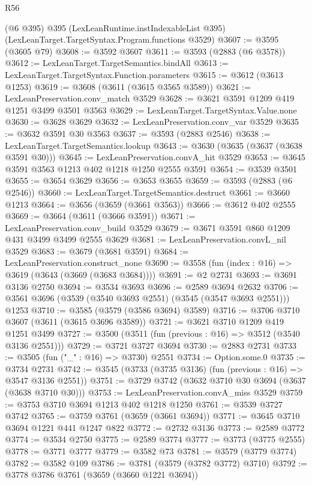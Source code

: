 \begin{lexlean}{R56}
\begin{coremodule}
    (@6 @395)
    @395
    (LexLeanRuntime.instIndexableList @395)
    (LexLeanTarget.TargetSyntax.Program.functions @3529)
@3607 := @3595 (@3605 @79)
@3608 := @3592 @3607
@3611 := @3593 (@2883 (@6 @3578))
@3612 := LexLeanTarget.TargetSemantics.bindAll
@3613 := LexLeanTarget.TargetSyntax.Function.parameters
@3615 := @3612 (@3613 @1253)
@3619 := @3608 (@3611 (@3615 @3565 @3589))
@3621 := LexLeanPreservation.conv_match @3529
@3628 := @3621 @3591 @1209 @419 @1251 @3499 @3501 @3563
@3629 := LexLeanTarget.TargetSyntax.Value.none
@3630 := @3628 @3629
@3632 := LexLeanPreservation.conv_var @3529
@3635 := @3632 @3591 @30 @3563
@3637 := @3593 (@2883 @2546)
@3638 := LexLeanTarget.TargetSemantics.lookup
@3643 := @3630 (@3635 (@3637 (@3638 @3591 @30)))
@3645 := LexLeanPreservation.convA_hit @3529
@3653 := @3645 @3591 @3563 @1213 @402 @1218 @1250 @2555 @3591
@3654 := @3539 @3501
@3655 := @3654 @3629
@3656 := @3653 @3655
@3659 := @3593 (@2883 (@6 @2546))
@3660 := LexLeanTarget.TargetSemantics.destruct
@3661 := @3660 @1213
@3664 := @3656 (@3659 (@3661 @3563))
@3666 := @3612 @402 @2555
@3669 := @3664 (@3611 (@3666 @3591))
@3671 := LexLeanPreservation.conv_build @3529
@3679 := @3671 @3591 @860 @1209 @431 @3499 @3499 @2555 @3629
@3681 := LexLeanPreservation.convL_nil @3529
@3683 := @3679 (@3681 @3591)
@3684 := LexLeanPreservation.construct_none
@3690 := @3558 (fun (index : @16) => @3619 (@3643 (@3669 (@3683 @3684))))
@3691 := @2 @2731
@3693 := @3691 @3136 @2750
@3694 := @3534 @3693
@3696 := @2589 @3694 @2632
@3706 := @3561 @3696 (@3539 (@3540 @3693 @2551) (@3545 (@3547 @3693 @2551))) @1253
@3710 := @3585 (@3579 (@3586 @3694) @3589)
@3716 := @3706 @3710 @3607 (@3611 (@3615 @3696 @3589))
@3721 := @3621 @3710 @1209 @419 @1251 @3499
@3727 := @3500 (@3511 (fun (previous : @16) => @3512 (@3540 @3136 @2551)))
@3729 := @3721 @3727 @3694
@3730 := @2883 @2731
@3733 := @3505 (fun ("_" : @16) => @3730) @2551
@3734 := Option.some.{0}
@3735 := @3734 @2731
@3742 := @3545 (@3733 (@3735 @3136) (fun (previous : @16) => @3547 @3136 @2551))
@3751 := @3729 @3742 (@3632 @3710 @30 @3694 (@3637 (@3638 @3710 @30)))
@3753 := LexLeanPreservation.convA_miss @3529
@3759 := @3753 @3710 @3694 @1213 @402 @1218 @1250
@3761 := @3539 @3727 @3742
@3765 := @3759 @3761 (@3659 (@3661 @3694))
@3771 := @3645 @3710 @3694 @1221 @441 @1247 @822
@3772 := @2732 @3136
@3773 := @2589 @3772
@3774 := @3534 @2750
@3775 := @2589 @3774
@3777 := @3773 (@3775 @2555)
@3778 := @3771 @3777
@3779 := @3582 @73
@3781 := @3579 (@3779 @3774)
@3782 := @3582 @109
@3786 := @3781 (@3579 (@3782 @3772) @3710)
@3792 := @3778 @3786 @3761 (@3659 (@3660 @1221 @3694))

\end{coremodule}
\end{lexlean}
